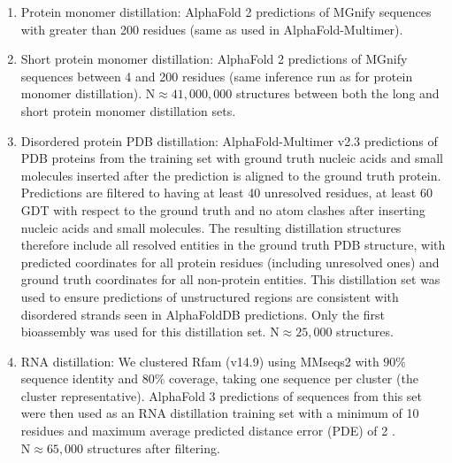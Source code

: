 \documentclass[10pt]{article}
\begin{document}
\begin{enumerate}
  \item Protein monomer distillation: AlphaFold 2 predictions of MGnify sequences with greater than 200 residues (same as used in AlphaFold-Multimer).
  \item Short protein monomer distillation: AlphaFold 2 predictions of MGnify sequences between 4 and 200 residues (same inference run as for protein monomer distillation). $\mathrm{N} \approx 41,000,000$ structures between both the long and short protein monomer distillation sets.
  \item Disordered protein PDB distillation: AlphaFold-Multimer v2.3 predictions of PDB proteins from the training set with ground truth nucleic acids and small molecules inserted after the prediction is aligned to the ground truth protein. Predictions are filtered to having at least 40 unresolved residues, at least 60 GDT with respect to the ground truth and no atom clashes after inserting nucleic acids and small molecules. The resulting distillation structures therefore include all resolved entities in the ground truth PDB structure, with predicted coordinates for all protein residues (including unresolved ones) and ground truth coordinates for all non-protein entities. This distillation set was used to ensure predictions of unstructured regions are consistent with disordered strands seen in AlphaFoldDB predictions. Only the first bioassembly was used for this distillation set. $\mathrm{N} \approx 25,000$ structures.
  \item RNA distillation: We clustered Rfam (v14.9) using MMseqs2 with $90 \%$ sequence identity and $80 \%$ coverage, taking one sequence per cluster (the cluster representative). AlphaFold 3 predictions of sequences from this set were then used as an RNA distillation training set with a minimum of 10 residues and maximum average predicted distance error (PDE) of 2 . $\mathrm{N} \approx 65,000$ structures after filtering.

\end{enumerate}
\end{document}
